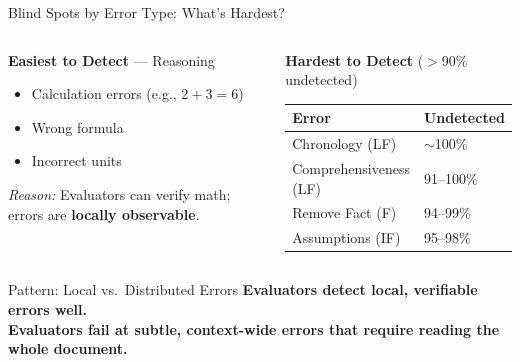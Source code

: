 \documentclass[aspectratio=169,10pt]{beamer}
\newcommand{\good}[1]{\textcolor{green!60!black}{\textbf{#1}}}
\newcommand{\bad}[1]{\textcolor{aclred}{\textbf{#1}}}
\begin{document}
\begin{frame}{Blind Spots by Error Type: What's Hardest?}
  \begin{columns}[T]
      \begin{block}{\good{Easiest to Detect} — Reasoning}
        \begin{itemize}
          \item Calculation errors (e.g., $2+3=6$)
          \item Wrong formula
          \item Incorrect units
        \end{itemize}
        \textit{Reason:} Evaluators can verify math; errors are \textbf{locally observable}.
      \end{block}

      \begin{alertblock}{\bad{Hardest to Detect} ($>$90\% undetected)}
        \begin{tabular}{lp{3.5cm}}
          \toprule
          \textbf{Error} & \textbf{Undetected} \\
          \midrule
          Chronology (LF)       & $\sim$100\% \\
          Comprehensiveness (LF) & 91–100\% \\
          Remove Fact (F)       & 94–99\% \\
          Assumptions (IF)      & 95–98\% \\
          \bottomrule
        \end{tabular}
      \end{alertblock}
  \end{columns}

  \vspace{0.5em}
  \begin{block}{Pattern: Local vs.\ Distributed Errors}
    \centering
    \textbf{Evaluators detect \good{local, verifiable} errors well.}\\
    \textbf{Evaluators fail at \bad{subtle, context-wide} errors that require reading the whole document.}
  \end{block}
\end{frame}
\end{document}
